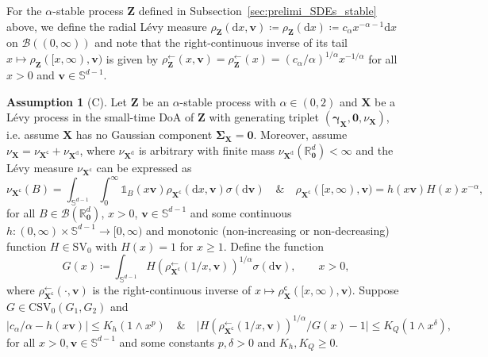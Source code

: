 \documentclass[en,oneside,bbfont,article]{amsart}
\theoremstyle{remark}
\theoremstyle{definition}
\theoremstyle{definition}
\newtheorem*{assumption*}{Assumption}
\newcommand\Sp{\mathbb{S}}
\newcommand\R{\mathbb{R}}
\newcommand\1{\mathds{1}}
\newcommand\SV{\mathrm{SV}}
\newcommand\CSV{\mathrm{CSV}}
\newcommand\la{\leftarrow}
\renewcommand\le{\leqslant}
\renewcommand\ge{\geqslant}
\newcommand\co{\mathsf{c}}
\newcommand{\D}{\mathrm{d}}
\begin{document}
For the $\alpha$-stable process $\bm{Z}$ defined in Subsection~\ref{sec:prelimi_SDEs_stable} above, we define the radial L\'evy measure $\rho_{\bm{Z}}(\D x,\bm{v})\coloneqq \rho_{\bm{Z}}(\D x)\coloneqq c_\alpha x^{-\alpha-1}\D x$ on $\mathcal{B}((0,\infty))$ and note that the right-continuous inverse of its tail $x \mapsto \rho_{\bm{Z}}([x,\infty),\bm{v})$ is given by $\rho_{\bm{Z}}^{\la}(x,\bm{v})=\rho_{\bm{Z}}^{\la}(x)=(c_\alpha/\alpha)^{1/\alpha}x^{-1/\alpha}$ for all $x>0$ and $\bm{v}\in \Sp^{d-1}$.
\begin{assumption*}[C]
\label{asm:C} 
Let $\bm{Z}$ be an $\alpha$-stable process with $\alpha\in(0,2)$ and $\bm{X}$ be a L\'evy process in the small-time DoA of $\bm{Z}$ with generating triplet $(\bm{\gamma}_{\bm{X}},\bm{0},\nu_{\bm{X}})$, i.e. assume $\bm{X}$ has no Gaussian component $\bm{\Sigma_X}=\bm{0}$. Moreover, assume $\nu_{\bm{X}}=\nu_{\bm{X}^{\co}}+\nu_{\bm{X}^{\mathrm{d}}}$, where $\nu_{\bm{X}^{\mathrm{d}}}$ is arbitrary with finite mass  $\nu_{\bm{X}^{\mathrm{d}}}(\R^d_{\bm{0}})<\infty$ and  the L\'evy measure $\nu_{\bm{X}^{\co}}$ 
can be expressed as 
\begin{equation}
\label{eq:radial_tail_decomp_C}
    \nu_{\bm{X}^{\co}}(B)
=\int_{\Sp^{d-1}}\int_0^\infty \1_{B}(x\bm{v})\rho_{\bm{X}^{\co}}(\D x,\bm{v})\sigma(\D\bm{v}) \quad\&\quad
\rho_{\bm{X}^{\co}}([x,\infty),\bm{v})
= h(x \bm{v}) H(x) x^{-\alpha},
\end{equation}
for all $B\in\mathcal{B}(\R^d_{\bm{0}})$,
$x>0$, $\bm{v}\in \Sp^{d-1}$ and some continuous $h:(0,\infty)\times \Sp^{d-1}\to [0,\infty)$ and monotonic (non-increasing or non-decreasing) function $H\in\SV_0$ with $H(x)=1$ for $x\ge 1$. Define the function
\begin{equation}
\label{eq:defn_G_C}
G(x)\coloneqq\int_{\Sp^{d-1}}H(\rho_{\bm{X}^\co}^{\la}(1/x,\bm{v}))^{1/\alpha}\sigma(\D \bm{v}),\qquad x>0,
\end{equation}
where $\rho_{\bm{X}^\co}^{\la}(\cdot,\bm{v})$ is the right-continuous inverse of $x\mapsto \rho_{\bm{X}}^\co([x,\infty),\bm{v})$. Suppose $G\in\CSV_0(G_1,G_2)$ and
\begin{equation}\label{eq:old_assump_(H)_C}
|c_\alpha/\alpha-h(x\bm{v})|
    \le K_h(1\wedge x^{p}) 
\quad \& \quad 
\big|H(\rho_{\bm{X}^\co}^{\la}(1/x,\bm{v}))^{1/\alpha}/G(x)-1\big|
    \le K_Q(1\wedge x^{\delta}),
\end{equation} for all $x>0, \bm{v} \in \Sp^{d-1}$ and some constants $p,\delta>0$ and $K_h,K_Q\ge 0$. 
\end{assumption*}
\end{document}
